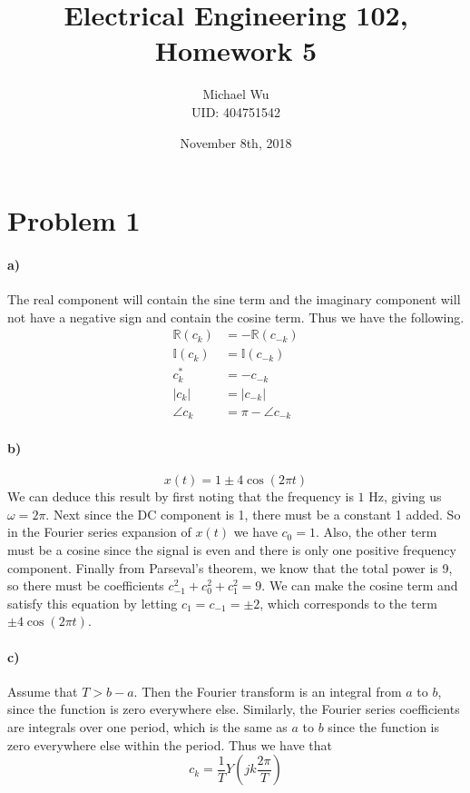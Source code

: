 \documentclass[12pt]{article}
\begin{document}
\title{Electrical Engineering 102, Homework 5}
\date{November 8th, 2018}
\author{Michael Wu\\UID: 404751542}
\maketitle

\section*{Problem 1}

\paragraph{a)}

The real component will contain the sine term and the imaginary component will not have a negative
sign and contain the cosine term. Thus we have the following.
\begin{align*}
    \mathbb{R}(c_k)&=-\mathbb{R}(c_{-k})\\
    \mathbb{I}(c_k)&=\mathbb{I}(c_{-k})\\
    c_k^*&=-c_{-k}\\
    |c_k|&=|c_{-k}|\\
    \angle c_k&=\pi-\angle c_{-k}
\end{align*}

\paragraph{b)}

\[x(t)=1\pm4\cos(2\pi t)\]
We can deduce this result by first noting that the frequency is \(1\) Hz, giving us \(\omega = 2\pi\).
Next since the DC component is 1, there must be a constant 1 added. So in the Fourier series expansion
of \(x(t)\) we have \(c_0=1\). Also, the other term must be a cosine since the signal is even and there is
only one positive frequency component. Finally from Parseval's theorem, we know that the total power is 9,
so there must be coefficients \(c_{-1}^2+c_0^2+c_1^2=9\). We can make the cosine term and satisfy this
equation by letting \(c_1=c_{-1}=\pm 2\), which corresponds to the term \(\pm 4\cos(2\pi t)\).

\paragraph{c)}

Assume that \(T>b-a\). Then the Fourier transform is an integral from \(a\) to \(b\), since the function is zero everywhere
else. Similarly, the Fourier series coefficients are integrals over one period, which is the same as \(a\) to \(b\) since
the function is zero everywhere else within the period. Thus we have that
\[c_k=\frac{1}{T}Y\left(jk\frac{2\pi}{T}\right)\]
\end{document}
